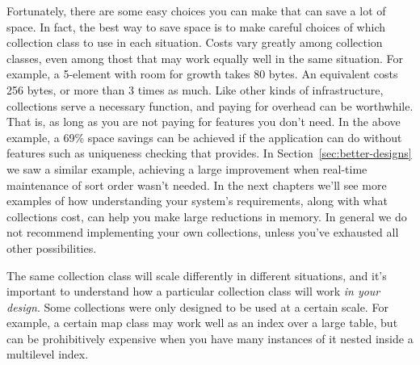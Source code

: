 


Fortunately, there are some
easy choices you can make that can save a lot of space. 
In fact, the best way to save space is to make careful choices of
which collection class to use in each situation.  
Costs vary greatly among collection classes, even among thost that may work equally well
in the same situation. 
For example, a 5-element  with room for growth takes 80 bytes. 
An equivalent  costs 256 bytes,
or more than 3 times as much. Like other kinds of infrastructure, collections
serve a necessary function, and paying for overhead can be worthwhile. That is, as long as you are not
paying for features you don't need. In the above example, a
69\% space savings can be achieved if the application can do without features
such as uniqueness checking that
 provides. In Section~\ref{sec:better-designs} we saw a similar
example, achieving a large improvement when real-time
maintenance of sort order wasn't needed. In the next chapters we'll see more
examples of how understanding your system's requirements, along with what
collections cost, can help you make large reductions in memory. 
In general we do not recommend implementing your own collections, unless you've
exhausted all other possibilities.

The same collection class will scale differently in different situations, and
it's important to understand how a particular collection class
will work \emph{in your design}. Some collections were only designed
to be used at a certain scale.
For example, a certain map class may work
well as an index over a large table, but can be prohibitively expensive when you
have many instances of it nested inside a multilevel index. 

